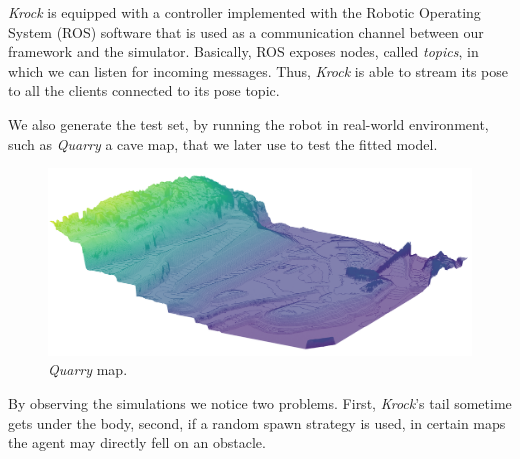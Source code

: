 \documentclass[../document.tex]{subfiles}
\begin{document}
\emph{Krock} is equipped with a controller implemented with the Robotic Operating System (ROS) software that is used as a communication channel between our framework and the simulator. Basically, ROS exposes nodes, called \emph{topics}, in which we can listen for incoming messages. Thus, \emph{Krock} is able to stream its pose to all the clients connected to its pose topic. 

We also generate the test set, by running the robot in real-world environment, such as \emph{Quarry} a cave map, that we later use to test the fitted model. 

\begin{figure}[H]
\centering
\includegraphics[width=\linewidth]{img/querry-big-10.png}
\caption{\emph{Quarry} map.}
\label{req: quarry}
\end{figure}

By observing the simulations we notice two problems. First, \emph{Krock}'s tail sometime gets under the body, second, if a random spawn strategy is used, in certain maps the agent may directly fell on an obstacle.
\end{document}
